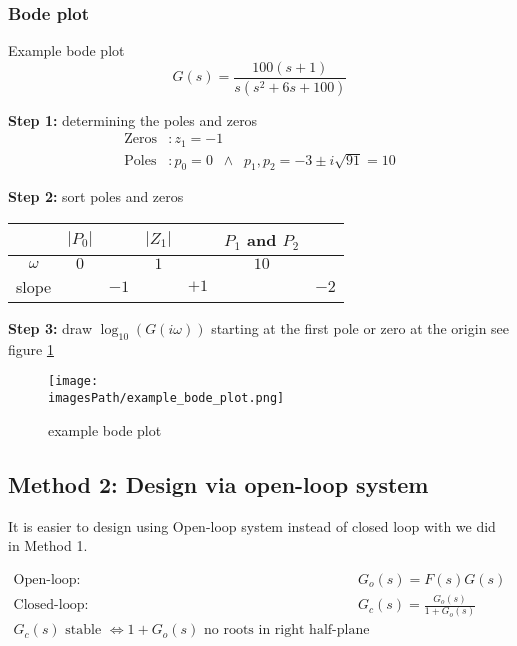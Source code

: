 \documentclass{article}
\newcommand{\imagesPath}{images}
\begin{document}
\subsubsection{Bode plot}
\begin{exampleblock}{Example bode plot}
    \begin{equation*}
        G(s) = \frac{100(s+1)}{s(s^2 + 6s + 100)}
    \end{equation*}

    \textbf{Step 1:} determining the poles and zeros
    \begin{align*}
        \text{Zeros}&: z_1 = -1 \\
        \text{Poles}&: p_0 = 0 \;\; \land \;\; p_1,p_2 = -3\pm i\sqrt{91} = 10
    \end{align*}

    \textbf{Step 2:} sort poles and zeros
    \begin{center}
    \begin{tabular}{ c | c c c c c c } 
      & $|P_0|$ & & $|Z_1|$ & & $P_1$ and $P_2$ & \\ 
     \hline
     $\omega$ & $0$ & & $1$ & & $10$ & \\ 
     slope & & $-1$ & &  $+1$ & & $-2$ \\ 
    \end{tabular}
    \end{center}

    \textbf{Step 3:} draw $\log_{10}(G(i\omega))$ starting at the first pole or zero at the origin
    see figure \ref{fig:example_bode_pot}    
\end{exampleblock}
\begin{figure}[!h]
    \centering
    \texttt{[image: \\imagesPath/example\_bode\_plot.png]}
    \caption{example bode plot}
    \label{fig:example_bode_pot}
\end{figure}

\subsection{Method 2: Design via open-loop system}
It is easier to design using Open-loop system instead of closed loop with we did in Method 1.

\begin{align*}
    \text{Open-loop: }  &G_o(s) = F(s)G(s) \\
    \text{Closed-loop: }  &G_c(s) = \frac{G_o(s)}{1+G_o(s)} \\
    G_c(s) \text{ stable } \Leftrightarrow 1+G_o(s) \text{ no roots in right half-plane}
\end{align*}
\end{document}
